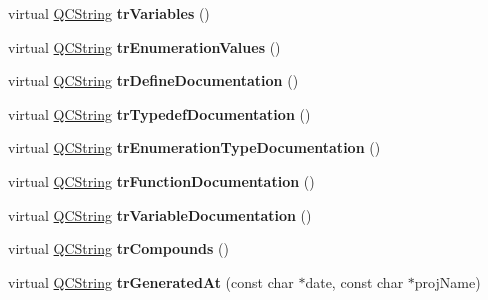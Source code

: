 \begin{DoxyCompactItemize}
\item 
\mbox{\label{class_translator_chinese_aa8382105fb4bf476af35c99eab73671d}} 
virtual \mbox{\hyperlink{class_q_c_string}{Q\+C\+String}} {\bfseries tr\+Variables} ()
\item 
\mbox{\label{class_translator_chinese_a7cf4f4542fa9a73019501f80c75bc2e0}} 
virtual \mbox{\hyperlink{class_q_c_string}{Q\+C\+String}} {\bfseries tr\+Enumeration\+Values} ()
\item 
\mbox{\label{class_translator_chinese_a96246e14b86470372617fb88bad8e060}} 
virtual \mbox{\hyperlink{class_q_c_string}{Q\+C\+String}} {\bfseries tr\+Define\+Documentation} ()
\item 
\mbox{\label{class_translator_chinese_af8f8455b20f46acf771a52ffde8a9ffa}} 
virtual \mbox{\hyperlink{class_q_c_string}{Q\+C\+String}} {\bfseries tr\+Typedef\+Documentation} ()
\item 
\mbox{\label{class_translator_chinese_a40349db2459b3ea248e9b14291db4d48}} 
virtual \mbox{\hyperlink{class_q_c_string}{Q\+C\+String}} {\bfseries tr\+Enumeration\+Type\+Documentation} ()
\item 
\mbox{\label{class_translator_chinese_ad4606add4c64a4cdea4eaf0a6676aa00}} 
virtual \mbox{\hyperlink{class_q_c_string}{Q\+C\+String}} {\bfseries tr\+Function\+Documentation} ()
\item 
\mbox{\label{class_translator_chinese_aa6c82d423d650d67d66bf2e41fecedd4}} 
virtual \mbox{\hyperlink{class_q_c_string}{Q\+C\+String}} {\bfseries tr\+Variable\+Documentation} ()
\item 
\mbox{\label{class_translator_chinese_a19c9dc872c0c350585e466340a3cd8f1}} 
virtual \mbox{\hyperlink{class_q_c_string}{Q\+C\+String}} {\bfseries tr\+Compounds} ()
\item 
\mbox{\label{class_translator_chinese_a0f54ecc3b245fc3ccbd3bdc8fdcd146c}} 
virtual \mbox{\hyperlink{class_q_c_string}{Q\+C\+String}} {\bfseries tr\+Generated\+At} (const char $\ast$date, const char $\ast$proj\+Name)

\end{DoxyCompactItemize}
